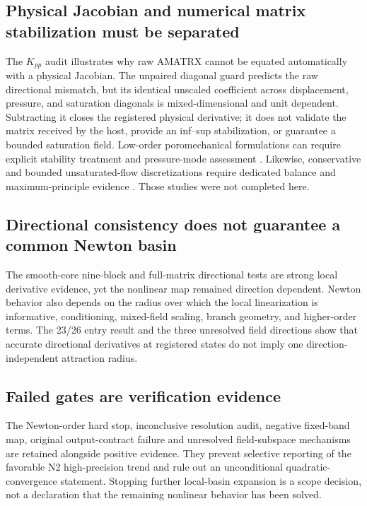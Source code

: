 \documentclass[preprint,12pt,authoryear]{elsarticle}
\begin{document}
\subsection{Physical Jacobian and numerical matrix stabilization must be separated}

The $K_{pp}$ audit illustrates why raw AMATRX cannot be equated automatically with a physical Jacobian. The unpaired diagonal guard predicts the raw directional mismatch, but its identical unscaled coefficient across displacement, pressure, and saturation diagonals is mixed-dimensional and unit dependent. Subtracting it closes the registered physical derivative; it does not validate the matrix received by the host, provide an inf--sup stabilization, or guarantee a bounded saturation field. Low-order poromechanical formulations can require explicit stability treatment and pressure-mode assessment \citep{whiteborja2008}. Likewise, conservative and bounded unsaturated-flow discretizations require dedicated balance and maximum-principle evidence \citep{celia1990}. Those studies were not completed here.

\subsection{Directional consistency does not guarantee a common Newton basin}

The smooth-core nine-block and full-matrix directional tests are strong local derivative evidence, yet the nonlinear map remained direction dependent. Newton behavior also depends on the radius over which the local linearization is informative, conditioning, mixed-field scaling, branch geometry, and higher-order terms. The 23/26 entry result and the three unresolved field directions show that accurate directional derivatives at registered states do not imply one direction-independent attraction radius.

\subsection{Failed gates are verification evidence}

The Newton-order hard stop, inconclusive resolution audit, negative fixed-band map, original output-contract failure and unresolved field-subspace mechanisms are retained alongside positive evidence. They prevent selective reporting of the favorable N2 high-precision trend and rule out an unconditional quadratic-convergence statement. Stopping further local-basin expansion is a scope decision, not a declaration that the remaining nonlinear behavior has been solved.
\end{document}
